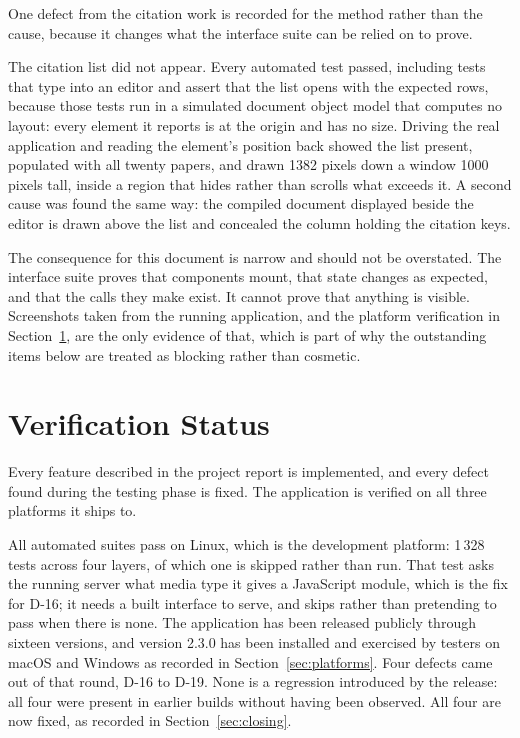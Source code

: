 \documentclass[12pt,a4paper]{report}
\begin{document}
One defect from the citation work is recorded for the method rather than the
cause, because it changes what the interface suite can be relied on to prove.

The citation list did not appear. Every automated test passed, including tests
that type into an editor and assert that the list opens with the expected rows,
because those tests run in a simulated document object model that computes no
layout: every element it reports is at the origin and has no size. Driving the
real application and reading the element's position back showed the list
present, populated with all twenty papers, and drawn 1382 pixels down a window
1000 pixels tall, inside a region that hides rather than scrolls what exceeds
it. A second cause was found the same way: the compiled document displayed
beside the editor is drawn above the list and concealed the column holding the
citation keys.

The consequence for this document is narrow and should not be overstated. The
interface suite proves that components mount, that state changes as expected,
and that the calls they make exist. It cannot prove that anything is visible.
Screenshots taken from the running application, and the platform verification
in Section~\ref{sec:outstanding}, are the only evidence of that, which is part of why the
outstanding items below are treated as blocking rather than cosmetic.


\section{Verification Status}\label{sec:outstanding}

Every feature described in the project report is implemented, and every defect
found during the testing phase is fixed. The application is verified on all
three platforms it ships to.

All automated suites pass on Linux, which is the development platform: 1\,328
tests across four layers, of which one is skipped rather than run. That test asks the running server what media type it
gives a JavaScript module, which is the fix for D-16; it needs a built
interface to serve, and skips rather than pretending to pass when there is
none. The application has
been released publicly through sixteen versions, and version 2.3.0 has been
installed and exercised by testers on macOS and Windows as recorded in
Section~\ref{sec:platforms}. Four defects came out of that round, D-16 to D-19. None is a
regression introduced by the release: all four were present in earlier builds
without having been observed. All four are now fixed, as recorded in
Section~\ref{sec:closing}.
\end{document}
